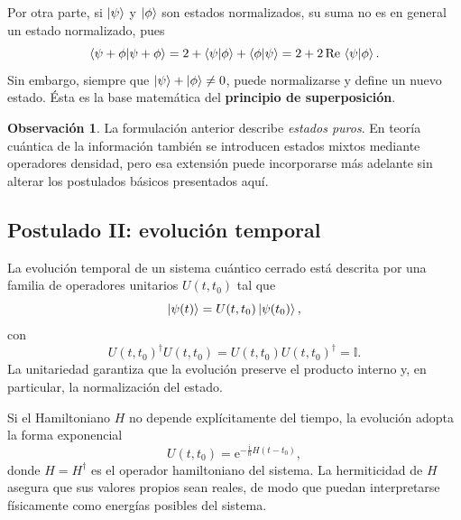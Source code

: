 \documentclass[12pt,a4paper]{article}
\theoremstyle{definition}
\newtheorem{observacion}[definicion]{Observación}
\theoremstyle{plain}
\theoremstyle{remark}
\newcommand{\I}{\mathbb{I}}
\newcommand{\ii}{\mathrm{i}}
\newcommand{\ee}{\mathrm{e}}
\begin{document}
Por otra parte, si $\ket{\psi}$ y $\ket{\phi}$ son estados normalizados, su suma no es en general un estado normalizado, pues
\begin{equation*}
    \braket{\psi+\phi|\psi+\phi}
    =
    2+\braket{\psi|\phi}+\braket{\phi|\psi}
    =
    2+2\,\mathrm{Re}\,\braket{\psi|\phi}.
\end{equation*}
Sin embargo, siempre que $\ket{\psi}+\ket{\phi}\neq 0$, puede normalizarse y define un nuevo estado. Ésta es la base matemática del \textbf{principio de superposición}.

\begin{observacion}
La formulación anterior describe \emph{estados puros}. En teoría cuántica de la información también se introducen estados mixtos mediante operadores densidad, pero esa extensión puede incorporarse más adelante sin alterar los postulados básicos presentados aquí.
\end{observacion}


\subsection{Postulado II: evolución temporal}

La evolución temporal de un sistema cuántico cerrado está descrita por una familia de operadores unitarios $U(t,t_0)$ tal que
\begin{equation*}
    \ket{\psi(t)} = U(t,t_0)\ket{\psi(t_0)},
\end{equation*}
con
\begin{equation*}
    U(t,t_0)^\dagger U(t,t_0)=U(t,t_0)U(t,t_0)^\dagger=\I.
\end{equation*}
La unitariedad garantiza que la evolución preserve el producto interno y, en particular, la normalización del estado.

Si el Hamiltoniano $H$ no depende explícitamente del tiempo, la evolución adopta la forma exponencial
\begin{equation*}
    U(t,t_0)=\ee^{-\frac{\ii}{\hbar}H(t-t_0)},
\end{equation*}
donde $H=H^\dagger$ es el operador hamiltoniano del sistema. La hermiticidad de $H$ asegura que sus valores propios sean reales, de modo que puedan interpretarse físicamente como energías posibles del sistema.
\end{document}

